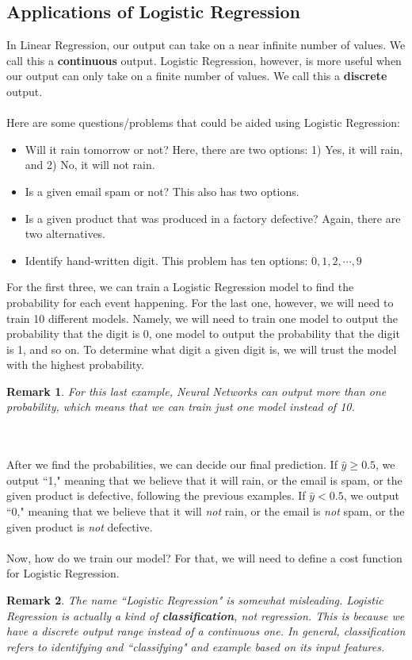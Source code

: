\documentclass{article}
\newtheorem*{remark}{Remark}
\begin{document}
\subsection{Applications of Logistic Regression}
In Linear Regression, our output can take on a near infinite number of values. We call this a \textbf{continuous} output. Logistic Regression, however, is more useful when our output can only take on a finite number of values. We call this a \textbf{discrete} output. 
\\
\\
Here are some questions/problems that could be aided using Logistic Regression:
\begin{itemize}
    \item Will it rain tomorrow or not? Here, there are two options: 1) Yes, it will rain, and 2) No, it will not rain.
    \item Is a given email spam or not? This also has two options.
    \item Is a given product that was produced in a factory defective? Again, there are two alternatives. 
    \item Identify hand-written digit. This problem has ten options: $0,1,2,\cdots,9$
\end{itemize}
For the first three, we can train a Logistic Regression model to find the probability for each event happening. For the last one, however, we will need to train 10 different models. Namely, we will need to train one model to output the probability that the digit is 0, one model to output the probability that the digit is 1, and so on. To determine what digit a given digit is, we will trust the model with the highest probability.
\begin{remark}
For this last example, Neural Networks can output more than one probability, which means that we can train just one model instead of 10.
\end{remark}
\\
\\
After we find the probabilities, we can decide our final prediction. If $\hat{y}\geq 0.5$, we output ``1," meaning that we believe that it will rain, or the email is spam, or the given product is defective, following the previous examples. If $\hat{y}< 0.5$, we output ``0," meaning that we believe that it will \textit{not} rain, or the email is \textit{not} spam, or the given product is \textit{not} defective.
\\
\\
Now, how do we train our model? For that, we will need to define a cost function for Logistic Regression.
\begin{remark}
The name ``Logistic Regression" is somewhat misleading. Logistic Regression is actually a kind of \textbf{classification}, not regression. This is because we have a discrete output range instead of a continuous one. In general, classification refers to identifying and ``classifying" and example based on its input features. 
\end{remark}
\end{document}
